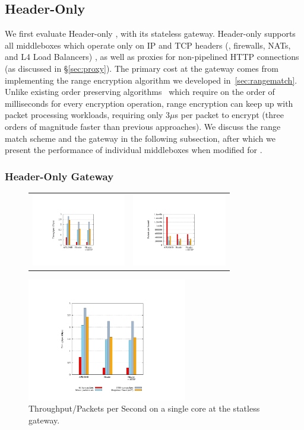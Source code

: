 \subsection{Header-Only \sys}
We first evaluate Header-only \sys, with its stateless gateway. 
Header-only \sys supports all middleboxes which operate only on IP and TCP headers (\eg{}, firewalls, NATs, and L4 Load Balancers) , as well as proxies for non-pipelined HTTP connections (as discussed in \S\ref{sec:proxy}).
The primary cost at the gateway comes from implementing the range encryption algorithm we developed in~\ref{sec:rangematch}. 
Unlike existing order preserving algorithms~\cite{mope,BCLO} which require on the order of milliseconds for every encryption operation, range encryption can keep up with packet processing workloads, requiring only 3$\mu$s per packet to encrypt (three orders of magnitude faster than previous approaches).
We discuss the range match scheme and the gateway in the following subsection, after which we present the performance of individual middleboxes when modified for \sys.

\subsubsection{Header-Only Gateway}
\begin{figure}[t]
  \centering
  \begin{tabular}{cc}
  \includegraphics[height=1.25in]{fig/gatewayxput}&
  \includegraphics[height=1.25in]{fig/gateway_pps}\\
  \end{tabular}
  \includegraphics[width=2.75in]{fig/key}
  \vspace{-10pt}
  \caption[]{\label{fig:gwxput} Throughput/Packets per Second on a single core at the statless gateway.}
\end{figure}

